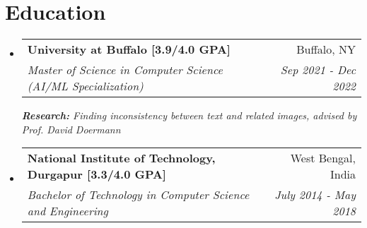 \documentclass[a4paper,20pt]{article}
\makeatletter
\newcommand{\resumeSubheading}[4]{
  \vspace{-1pt}\item
    \begin{tabular*}{0.97\textwidth}{l@{\extracolsep{\fill}}r}
      \textbf{#1} & #2 \\
      \textit{#3} & \textit{#4} \\
    \end{tabular*}\vspace{-5pt}
}
\newcommand{\resumeSubHeadingListStart}{\begin{itemize}[leftmargin=*]}
\newcommand{\resumeSubHeadingListEnd}{\end{itemize}}
\makeatother
\begin{document}
\section{Education}
  \resumeSubHeadingListStart
    \resumeSubheading
      {University at Buffalo [3.9/4.0 GPA] }{Buffalo, NY}
      {Master of Science in Computer Science (AI/ML Specialization)}{Sep 2021 - Dec 2022}
      {\scriptsize \textit{ \footnotesize{\newline{}\textbf{Research:} Finding inconsistency between text and related images, advised by Prof. David Doermann}}}
    \resumeSubHeadingListEnd
    
    \resumeSubHeadingListStart
    \resumeSubheading
      {National Institute of Technology, Durgapur [3.3/4.0 GPA]}{West Bengal, India}
      {Bachelor of Technology in Computer Science and Engineering}{July 2014 - May 2018}
    \resumeSubHeadingListEnd
	    
\vspace{-8pt}
\end{document}
